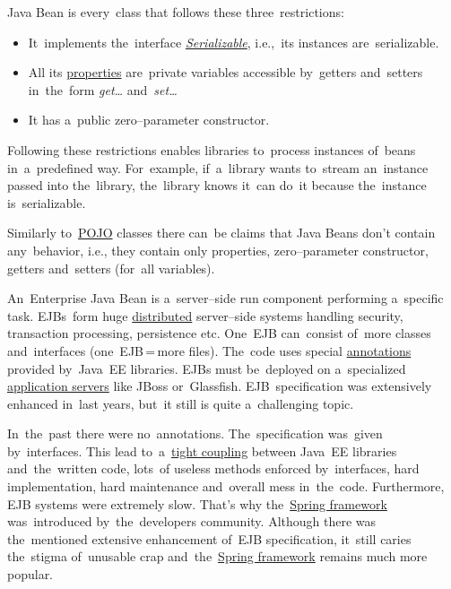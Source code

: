 \label{javabeans}
Java Bean is every~class that follows these three~restrictions:
\begin{itemize}
    \item It~implements the~interface \hyperref[serialization]{\textit{Serializable}}, i.e.,~its instances are~serializable.
    \item All its \hyperref[variablefieldproperty]{properties} are~private variables accessible by~getters and~setters in~the~form \textit{get\dots} and~\textit{set\dots}
    \item It has a~public zero--parameter constructor.
\end{itemize}
\noindent Following these restrictions enables libraries to~process instances of~beans in~a~predefined way. For~example, if~a~library wants to~stream an~instance passed into the~library, the~library knows it~can do~it because the~instance is~serializable.

\warning Similarly to~\hyperref[pojo]{POJO} classes there can~be claims that Java Beans don't contain any~behavior, i.e., they contain only properties, zero--parameter constructor, getters and~setters (for~all variables).

\label{ejb}
An~Enterprise Java Bean is a~server--side run component performing a~specific task. EJBs~form huge \hyperref[distributedsystem]{distributed} server--side systems handling security, transaction processing, persistence etc. One~EJB can~consist of~more classes and~interfaces (one~EJB\,=\,more files). The~code uses special \hyperref[annotations]{annotations} provided by~Java~EE libraries. EJBs must be~deployed on a~specialized \hyperref[applicationserver]{application servers} like JBoss or~Glassfish. EJB~specification was extensively enhanced in~last years, but~it still is quite a~challenging topic.

In~the~past there were no~annotations. The~specification was~given by~interfaces. This lead to~a~\hyperref[loosetightcoupling]{tight coupling} between Java~EE libraries and~the~written code, lots~of useless methods enforced by~interfaces, hard implementation, hard maintenance and~overall mess in~the~code. Furthermore, EJB systems were extremely slow. That's why the~\hyperref[springframework]{Spring framework} was~introduced by~the~developers community. Although there was the~mentioned extensive enhancement of~EJB specification, it~still caries the~stigma of~unusable crap and~the~\hyperref[springframework]{Spring framework} remains much more popular.

